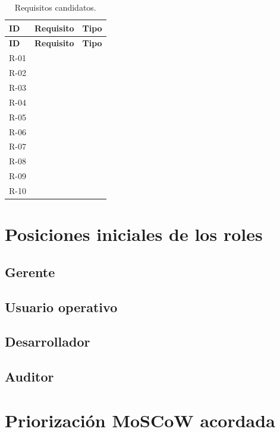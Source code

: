 \documentclass[11pt,a4paper]{article}
\begin{document}
\begin{longtable}{|L{1.2cm}|L{10cm}|L{2.5cm}|}
\caption{Requisitos candidatos.}
\label{tab:requisitos}\\
\hline
{}
\textbf{ID} & \textbf{Requisito} & \textbf{Tipo} \\
\hline
\endfirsthead

\hline
{}
\textbf{ID} & \textbf{Requisito} & \textbf{Tipo} \\
\hline
\endhead

R-01 & & \\ \hline
R-02 & & \\ \hline
R-03 & & \\ \hline
R-04 & & \\ \hline
R-05 & & \\ \hline
R-06 & & \\ \hline
R-07 & & \\ \hline
R-08 & & \\ \hline
R-09 & & \\ \hline
R-10 & & \\ \hline

\end{longtable}

\section{Posiciones iniciales de los roles}

\subsection{Gerente}

\subsection{Usuario operativo}

\subsection{Desarrollador}

\subsection{Auditor}

\section{Priorización MoSCoW acordada}
\end{document}
